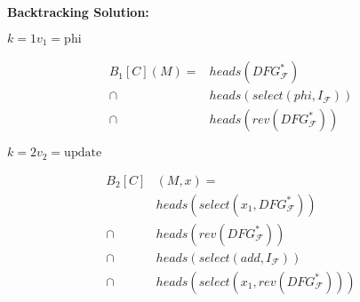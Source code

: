 \vspace{1cm}
\begin{minipage}[t]{6cm}
    \centering
    {\Large\bf Backtracking Solution:}

    $k=1$\quad$v_1=\text{phi}$
    \begin{graybox}
        \setlength{\abovedisplayskip}{0pt}
        \setlength{\belowdisplayskip}{0pt}
        \vspace{-0.5em}
        \begin{align*}
            B_1[C](M)={}&heads(DFG_\mathcal{F}^*)\\
                \mathrel\cap{}&heads(select(phi,I_\mathcal{F}))\\
                \mathrel\cap{}&heads(rev(DFG_\mathcal{F}^*))
        \end{align*}
    \end{graybox}
    \vspace{-0.75em}
    \hspace{0.3cm}
    \hspace{0.3cm}

    $k=2$\quad$v_2=\text{update}$
    \begin{graybox}
        \setlength{\abovedisplayskip}{0pt}
        \setlength{\belowdisplayskip}{0pt}
        \vspace{-0.5em}
        \begin{align*}
            B_2[C]&(M,x)=\\
                            {}&heads(select(x_1,DFG_\mathcal{F}^*))\\
                \mathrel\cap{}&heads(rev(DFG_\mathcal{F}^*))\\
                \mathrel\cap{}&heads(select(add,I_\mathcal{F}))\\
                \mathrel\cap{}&heads(select(x_1,rev(DFG_\mathcal{F}^*)))
        \end{align*}
    \end{graybox}
    \vspace{-0.75em}
    \hspace{0.3cm}
    \hspace{0.3cm}


\end{minipage}
